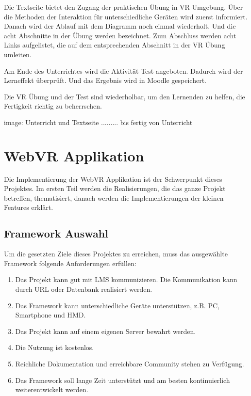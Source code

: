  Die Textseite bietet den Zugang der praktischen Übung in VR Umgebung. Über die Methoden der Interaktion für unterschiedliche Geräten wird zuerst informiert. Danach wird der Ablauf mit dem Diagramm noch einmal wiederholt. Und die acht Abschnitte in der Übung werden bezeichnet. Zum Abschluss werden acht Links aufgelistet, die auf dem entsprechenden Abschnitt in der VR Übung umleiten.
 
 Am Ende des Unterrichtes wird die Aktivität Test angeboten. Dadurch wird der Lerneffekt überprüft. Und das Ergebnis wird in Moodle gespeichert.
 
 Die VR Übung und der Test sind wiederholbar, um den Lernenden zu helfen, die Fertigkeit richtig zu beherrschen.
 
 image: Unterricht und Textseite ......... bis fertig von Unterricht
 
\section{WebVR Applikation}
Die Implementierung der WebVR Applikation ist der Schwerpunkt dieses Projektes. Im ersten Teil werden die Realisierungen, die das ganze Projekt betreffen, thematisiert, danach werden die Implementierungen der kleinen Features erklärt.

 \subsection{Framework Auswahl}
 
 Um die gesetzten Ziele dieses Projektes zu erreichen, muss das ausgewählte Framework folgende Anforderungen erfüllen:
 
 \begin{enumerate}
     \item Das Projekt kann gut mit LMS kommunizieren. Die Kommunikation kann durch URL oder Datenbank realisiert werden.
     \item Das Framework kann unterschiedliche Geräte unterstützen, z.B. PC, Smartphone und HMD.
     \item Das Projekt kann auf einem eigenen Server bewahrt werden.
     \item Die Nutzung ist kostenlos.
     \item Reichliche Dokumentation und erreichbare Community stehen zu Verfügung.
     \item Das Framework soll lange Zeit unterstützt und am besten kontinuierlich weiterentwickelt werden.
 \end{enumerate}
 
